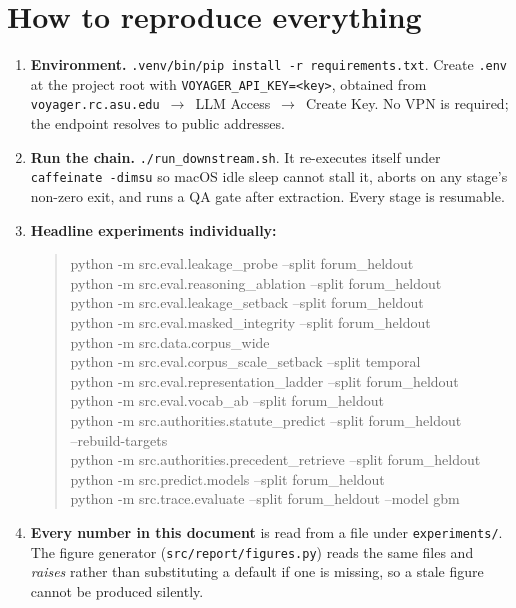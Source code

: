 \documentclass[12pt,a4paper]{article}
\newcommand{\code}[1]{\texttt{\small #1}}
\begin{document}
\appendix
\section{How to reproduce everything}

\begin{enumerate}
\item \textbf{Environment.} \code{.venv/bin/pip install -r requirements.txt}. Create \code{.env} at
the project root with \code{VOYAGER\_API\_KEY=<key>}, obtained from
\code{voyager.rc.asu.edu}~$\rightarrow$~LLM Access~$\rightarrow$~Create Key. No VPN is required; the
endpoint resolves to public addresses.
\item \textbf{Run the chain.} \code{./run\_downstream.sh}. It re-executes itself under
\code{caffeinate -dimsu} so macOS idle sleep cannot stall it, aborts on any stage's non-zero exit,
and runs a QA gate after extraction. Every stage is resumable.
\item \textbf{Headline experiments individually:}
\begin{quote}\footnotesize\ttfamily\raggedright
python -m src.eval.leakage\_probe --split forum\_heldout\\
python -m src.eval.reasoning\_ablation --split forum\_heldout\\
python -m src.eval.leakage\_setback --split forum\_heldout\\
python -m src.eval.masked\_integrity --split forum\_heldout\\
python -m src.data.corpus\_wide\\
python -m src.eval.corpus\_scale\_setback --split temporal\\
python -m src.eval.representation\_ladder --split forum\_heldout\\
python -m src.eval.vocab\_ab --split forum\_heldout\\
python -m src.authorities.statute\_predict --split forum\_heldout\\
\hspace*{2em}--rebuild-targets\\
python -m src.authorities.precedent\_retrieve --split forum\_heldout\\
python -m src.predict.models --split forum\_heldout\\
python -m src.trace.evaluate --split forum\_heldout --model gbm
\end{quote}
\item \textbf{Every number in this document} is read from a file under \code{experiments/}. The
figure generator (\code{src/report/figures.py}) reads the same files and \emph{raises} rather than
substituting a default if one is missing, so a stale figure cannot be produced silently.
\end{enumerate}
\end{document}

